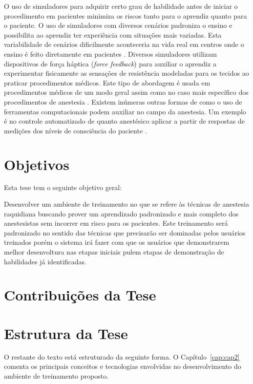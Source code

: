 O uso de simuladores para adquirir certo grau de habilidade antes de iniciar o procedimento em pacientes minimiza os riscos tanto para o aprendiz quanto para o paciente. O uso de simuladores com diversos cenários padroniza o ensino e possibilita ao aprendiz ter experiência com situações mais variadas.  Esta variabilidade de cenários dificilmente aconteceria na vida real em centros onde o ensino é feito diretamente em pacientes \cite{Udani2015}. Diversos simuladores utilizam dispositivos de força háptica (\textit{force feedback}) para auxiliar o aprendiz a experimentar fisicamente as sensações de resistência modeladas para os tecidos ao praticar procedimentos médicos. Este tipo de abordagem é usada em procedimentos médicos de um modo geral \cite{Escobar-Castillejos2016} assim como no caso mais específico dos procedimentos de anestesia \cite{Vaughan2013}. Existem inúmeras outras formas de como o uso de ferramentas computacionais podem auxiliar no campo da anestesia. Um exemplo é no controle automatizado de quanto anestésico aplicar a partir de respostas de medições dos níveis de consciência do paciente \cite{Mendez2009}.

\section{Objetivos}
\label{sec:objetivos}

Esta tese tem o seguinte objetivo geral:

Desenvolver um ambiente de treinamento no que se refere às técnicas de anestesia raquidiana buscando prover um aprendizado padronizado e mais completo dos anestesistas sem incorrer em risco para os pacientes. Este treinamento será padronizado no sentido das técnicas que precisarão ser dominadas pelos usuários treinados  porém o sistema irá fazer com que os usuários que demonstrarem melhor desenvoltura nas etapas iniciais pulem etapas de demonstração de habilidades já identificadas. 

\section{Contribuições da Tese}
\label{sec:contribuicoes}



\section{Estrutura da Tese}
\label{sec:estrutura}

O restante do texto está estruturado da seguinte forma. O Capítulo~\ref{cap:cap2} comenta os principais conceitos e tecnologias envolvidas no desenvolvimento do ambiente de treinamento proposto.

